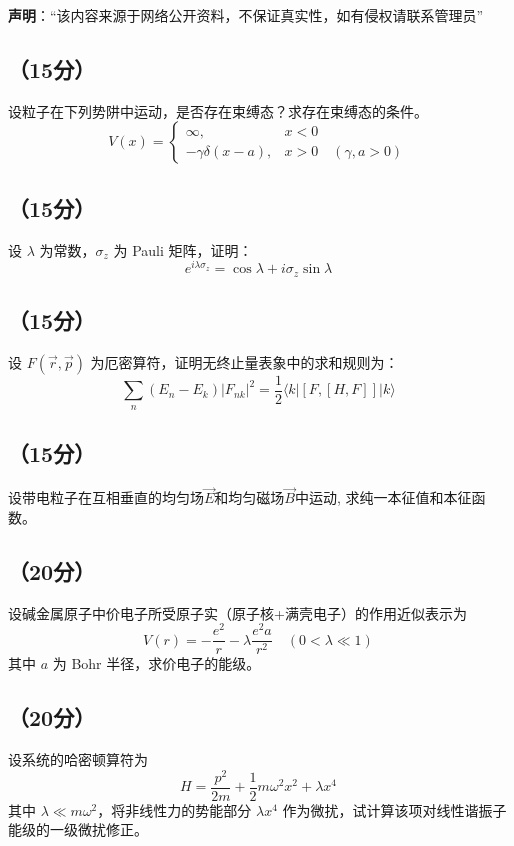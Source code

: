 
\textbf{声明}：“该内容来源于网络公开资料，不保证真实性，如有侵权请联系管理员”

\subsection{（15分）}
设粒子在下列势阱中运动，是否存在束缚态？求存在束缚态的条件。
\[
V(x) =
\begin{cases}
\infty, & x < 0 \\
-\gamma \delta(x - a), & x > 0 \quad (\gamma, a > 0)
\end{cases}~
\]

\subsection{（15分）}
设 $\lambda$ 为常数，$\sigma_z$ 为 Pauli 矩阵，证明：
    \[
    e^{i \lambda \sigma_z} = \cos \lambda + i \sigma_z \sin \lambda~
    \]

\subsection{（15分）}
设 $F(\vec{r},\vec{p})$ 为厄密算符，证明无终止量表象中的求和规则为：
    \[
    \sum_n (E_n - E_k) |F_{nk}|^2 = \frac{1}{2} \langle k | [F, [H, F]] | k \rangle~
    \]

\subsection{（15分）}
设带电粒子在互相垂直的均匀场$\vec{E}$和均匀磁场$\vec{B}$中运动, 求纯一本征值和本征函数。

\subsection{（20分）}
设碱金属原子中价电子所受原子实（原子核+满壳电子）的作用近似表示为
\[
V(r) = -\frac{e^2}{r} - \lambda \frac{e^2 a}{r^2} \quad (0 < \lambda \ll 1)~
\]
其中 $a$ 为 Bohr 半径，求价电子的能级。

\subsection{（20分）}
设系统的哈密顿算符为 
\[
H = \frac{p^2}{2m} + \frac{1}{2}m\omega^2 x^2 + \lambda x^4~
\]
其中 $\lambda \ll m\omega^2$，将非线性力的势能部分 $\lambda x^4$ 作为微扰，试计算该项对线性谐振子能级的一级微扰修正。